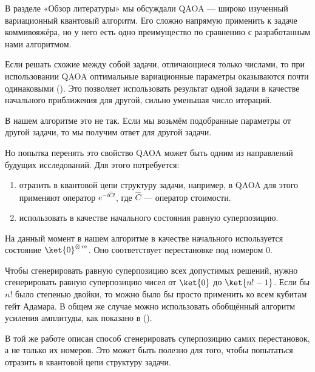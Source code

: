

В разделе «Обзор литературы» мы обсуждали QAOA --- широко изученный вариационный квантовый алгоритм. Его сложно напрямую применить к задаче коммивояжёра, но у него есть одно преимущество по сравнению с разработанным нами алгоритмом. 

Если решать схожие между собой задачи, отличающиеся только числами, то при использовании QAOA оптимальные вариационные параметры оказываются почти одинаковыми \cite{Params} (\citeyear{Params}). Это позволяет использовать результат одной задачи в качестве начального приближения для другой, сильно уменьшая число итераций.

В нашем алгоритме это не так. Если мы возьмём подобранные параметры от другой задачи, то мы получим ответ для другой задачи.

Но попытка перенять это свойство QAOA может быть одним из направлений будущих исследований. Для этого потребуется:

\begin{enumerate}
    \item отразить в квантовой цепи структуру задачи, например, в QAOA для этого применяют оператор $e^{-i \hat C t}$, где $\hat C$ --- оператор стоимости.
    
    \item использовать в качестве начального состояния равную суперпозицию.
\end{enumerate}

На данный момент в нашем алгоритме в качестве начального используется состояние $\ket{0}^{\otimes\, m}$. Оно соответствует перестановке под номером 0. 

Чтобы сгенерировать равную суперпозицию всех допустимых решений, нужно сгенерировать равную суперпозицию чисел от $\ket{0}$ до $\ket{n!-1}$. Если бы $n!$ было степенью двойки, то можно было бы просто применить ко всем кубитам гейт Адамара. В общем же случае можно использовать обобщённый алгоритм усиления амплитуды, как показано в \cite{perms} (\citeyear{perms}). 

В той же работе \cite{perms} описан способ сгенерировать суперпозицию самих перестановок, а не только их номеров. Это может быть полезно для того, чтобы попытаться отразить в квантовой цепи структуру задачи.


